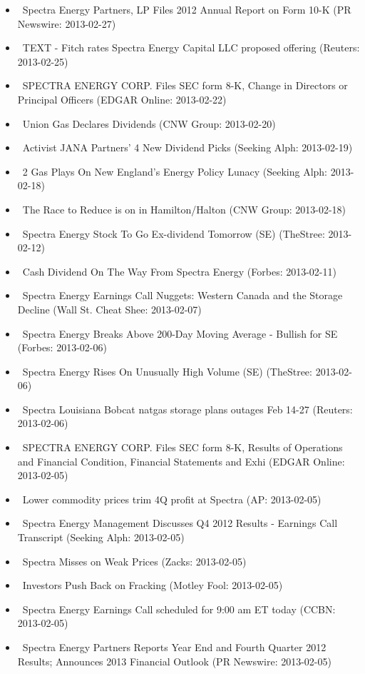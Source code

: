 \documentclass[11pt,asymmetric]{article}
\begin{document}
\begin{itemize}
\item\ Spectra Energy Partners, LP Files 2012 Annual Report on Form 10-K (PR Newswire: 2013-02-27)
\item\ TEXT - Fitch rates Spectra Energy Capital LLC proposed offering (Reuters: 2013-02-25)
\item\ SPECTRA ENERGY CORP. Files SEC form 8-K, Change in Directors or Principal Officers (EDGAR Online: 2013-02-22)
\item\ Union Gas Declares Dividends (CNW Group: 2013-02-20)
\item\ Activist JANA Partners' 4 New Dividend Picks (Seeking Alph: 2013-02-19)
\item\ 2 Gas Plays On New England's Energy Policy Lunacy (Seeking Alph: 2013-02-18)
\item\ The Race to Reduce is on in Hamilton/Halton (CNW Group: 2013-02-18)
\item\ Spectra Energy Stock To Go Ex-dividend Tomorrow (SE) (TheStree: 2013-02-12)
\item\ Cash Dividend On The Way From Spectra Energy (Forbes: 2013-02-11)
\item\ Spectra Energy Earnings Call Nuggets: Western Canada and the Storage Decline (Wall St. Cheat Shee: 2013-02-07)
\item\ Spectra Energy Breaks Above 200-Day Moving Average - Bullish for SE (Forbes: 2013-02-06)
\item\ Spectra Energy Rises On Unusually High Volume (SE) (TheStree: 2013-02-06)
\item\ Spectra Louisiana Bobcat natgas storage plans outages Feb 14-27 (Reuters: 2013-02-06)
\item\ SPECTRA ENERGY CORP. Files SEC form 8-K, Results of Operations and Financial Condition, Financial Statements and Exhi (EDGAR Online: 2013-02-05)
\item\ Lower commodity prices trim 4Q profit at Spectra (AP: 2013-02-05)
\item\ Spectra Energy Management Discusses Q4 2012 Results - Earnings Call Transcript (Seeking Alph: 2013-02-05)
\item\ Spectra Misses on Weak Prices (Zacks: 2013-02-05)
\item\ Investors Push Back on Fracking (Motley Fool: 2013-02-05)
\item\ Spectra Energy Earnings Call scheduled for 9:00 am ET today (CCBN: 2013-02-05)
\item\ Spectra Energy Partners Reports Year End and Fourth Quarter 2012 Results; Announces 2013 Financial Outlook (PR Newswire: 2013-02-05)

\end{itemize}
\end{document}
